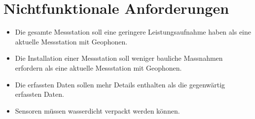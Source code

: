 %
%

\thispagestyle{empty}
\chapter{Nichtfunktionale Anforderungen}\label{chap.nichtfunktionale}

\begin{itemize}
\item Die gesamte Messstation soll eine geringere Leistungsaufnahme haben als eine aktuelle Messstation mit Geophonen.
\item Die Installation einer Messstation soll weniger bauliche Massnahmen erfordern als eine aktuelle Messstation mit Geophonen.
\item Die erfassten Daten sollen mehr Details enthalten als die gegenwärtig erfassten Daten.
\item Sensoren müssen wasserdicht verpackt werden können.
\
\end{itemize}